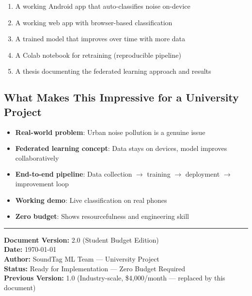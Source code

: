 \documentclass[11pt,a4paper]{article}
\begin{document}
\begin{enumerate}[leftmargin=*,noitemsep]
    \item A working Android app that auto-classifies noise on-device
    \item A working web app with browser-based classification
    \item A trained model that improves over time with more data
    \item A Colab notebook for retraining (reproducible pipeline)
    \item A thesis documenting the federated learning approach and results
\end{enumerate}

\subsection{What Makes This Impressive for a University Project}

\begin{itemize}[leftmargin=*,noitemsep]
    \item \textbf{Real-world problem}: Urban noise pollution is a genuine issue
    \item \textbf{Federated learning concept}: Data stays on devices, model improves collaboratively
    \item \textbf{End-to-end pipeline}: Data collection $\rightarrow$ training $\rightarrow$ deployment $\rightarrow$ improvement loop
    \item \textbf{Working demo}: Live classification on real phones
    \item \textbf{Zero budget}: Shows resourcefulness and engineering skill
\end{itemize}

\vspace{1cm}
\noindent\rule{\textwidth}{0.5pt}
\noindent\textbf{Document Version:} 2.0 (Student Budget Edition) \\
\noindent\textbf{Date:} \today \\
\noindent\textbf{Author:} SoundTag ML Team — University Project \\
\noindent\textbf{Status:} Ready for Implementation — Zero Budget Required \\
\noindent\textbf{Previous Version:} 1.0 (Industry-scale, \$4,000/month — replaced by this document)
\end{document}
